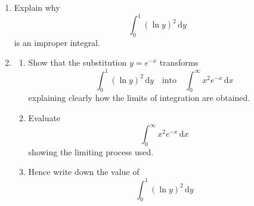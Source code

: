 \documentclass[leqno]{article}
\begin{document}
\begin{enumerate}[
  label=\textbf{\arabic*.},
  leftmargin=*,
  topsep=0pt,
  partopsep=0pt,
  parsep=0pt
]
\begin{enumerate}[label=\textbf{(\alph*)}]
  \item Explain why
  \[\int_{0}^{1} (\ln y)^2\,\mathrm{d}y\]
  is an improper integral.  \\
  \item
  \begin{enumerate}[label=(\roman*)]
    \item Show that the substitution $y = e^{-x}$ transforms
    \[\int_{0}^{1} (\ln y)^2\,\mathrm{d}y \quad \text{into} \quad \int_{0}^{\infty} x^2 e^{-x}\,\mathrm{d}x\]
    explaining clearly how the limits of integration are obtained.  \\
    \item Evaluate
    \[\int_{0}^{\infty} x^2 e^{-x}\,\mathrm{d}x\]
    showing the limiting process used.  \\
    \item Hence write down the value of
    \[\int_{0}^{1} (\ln y)^2\,\mathrm{d}y\] 
  \end{enumerate}
\end{enumerate}

\end{enumerate}
\end{document}
